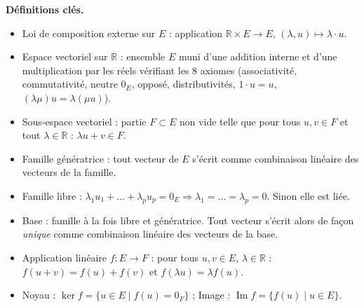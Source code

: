\documentclass[11pt]{article}
\newcommand{\cle}[1]{{\popxbold\color{popdark}#1}}
\begin{document}
\begin{aretenir}[L'essentiel de la le\c{c}on]
\textbf{D\'efinitions cl\'es.}
\begin{itemize}
  \item \cle{Loi de composition externe} sur $E$ : application $\mathbb{R}\times E\to E$, $(\lambda,u)\mapsto\lambda\cdot u$.
  \item \cle{Espace vectoriel sur $\mathbb{R}$} : ensemble $E$ muni d'une addition interne et d'une multiplication par les r\'eels v\'erifiant les 8 axiomes (associativit\'e, commutativit\'e, neutre $0_E$, oppos\'e, distributivit\'es, $1\cdot u=u$, $(\lambda\mu)u=\lambda(\mu u)$).
  \item \cle{Sous-espace vectoriel} : partie $F\subset E$ non vide telle que pour tous $u,v\in F$ et tout $\lambda\in\mathbb{R}$ : $\lambda u+v\in F$.
  \item Famille \cle{g\'en\'eratrice} : tout vecteur de $E$ s'\'ecrit comme combinaison lin\'eaire des vecteurs de la famille.
  \item Famille \cle{libre} : $\lambda_1u_1+\dots+\lambda_pu_p=0_E \Rightarrow \lambda_1=\dots=\lambda_p=0$. Sinon elle est \cle{li\'ee}.
  \item \cle{Base} : famille \`a la fois libre et g\'en\'eratrice. Tout vecteur s'\'ecrit alors de fa\c{c}on \emph{unique} comme combinaison lin\'eaire des vecteurs de la base.
  \item \cle{Application lin\'eaire} $f:E\to F$ : pour tous $u,v\in E$, $\lambda\in\mathbb{R}$ : $f(u+v)=f(u)+f(v)$ et $f(\lambda u)=\lambda f(u)$.
  \item \cle{Noyau} : $\ker f=\{u\in E\mid f(u)=0_F\}$ ; \cle{Image} : $\operatorname{Im}f=\{f(u)\mid u\in E\}$.
\end{itemize}


\end{aretenir}
\end{document}
